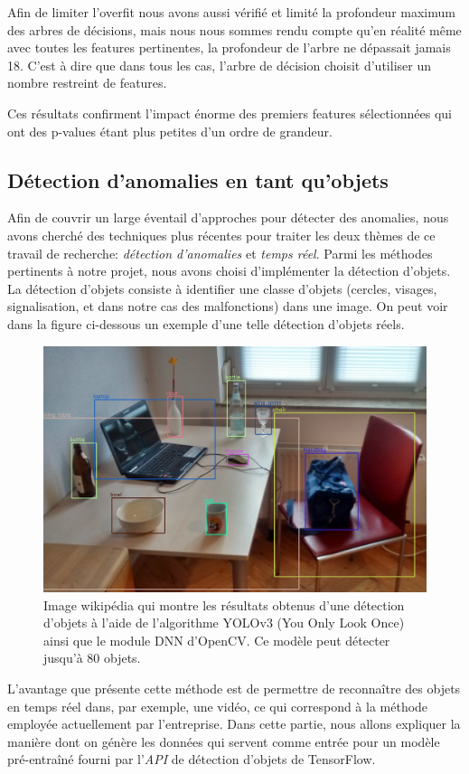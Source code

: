 \documentclass[french]{article}
\theoremstyle{mytheoremstyle}
\theoremstyle{mytheoremstyle}
\theoremstyle{myproblemstyle}
\begin{document}
        Afin de limiter l'overfit nous avons aussi vérifié et limité la profondeur maximum des arbres de décisions, mais nous nous sommes rendu compte qu'en réalité même avec toutes les features pertinentes, la profondeur de l'arbre ne dépassait jamais 18. C'est à dire que dans tous les cas, l'arbre de décision choisit d'utiliser un nombre restreint de features.
        
        Ces résultats confirment l'impact énorme des premiers features sélectionnées qui ont des p-values étant plus petites d'un ordre de grandeur.
    
        \subsection{Détection d'anomalies en tant qu'objets}
        Afin de couvrir un large éventail d'approches pour détecter des anomalies, nous avons cherché des techniques plus récentes pour traiter les deux thèmes de ce travail de recherche: \emph{détection d'anomalies} et \emph{temps réel}. Parmi les méthodes pertinents à notre projet, nous avons choisi d'implémenter la détection d'objets. La détection d'objets consiste à identifier une classe d'objets (cercles, visages, signalisation, et dans notre cas des malfonctions) dans une image\cite{odwikipedia}. On peut voir dans la figure ci-dessous un exemple d'une telle détection d'objets réels.
        \begin{figure}[H]
            \centering
            \includegraphics[width=1\textwidth]{images/real_objects.jpg}
            \caption{Image wikipédia qui montre les résultats obtenus d'une détection d'objets à l'aide de l'algorithme YOLOv3 (You Only Look Once) ainsi que le module DNN d'OpenCV. Ce modèle peut détecter jusqu'à 80 objets.}
            \label{}
        \end{figure}
        L'avantage que présente cette méthode est de permettre de reconnaître des objets en temps réel dans, par exemple, une vidéo, ce qui correspond à la méthode employée actuellement par l'entreprise. Dans cette partie, nous allons expliquer la manière dont on génère les données qui servent comme entrée pour un modèle pré-entraîné fourni par l'\emph{API} de détection d'objets de TensorFlow.
\end{document}
